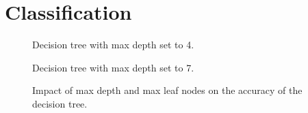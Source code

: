 \section{Classification} \label{sec:classfication}

\begin{figure}
    \centering
    \caption{Decision tree with max depth set to 4.}
    \label{fig:tree_4}
\end{figure}

\begin{figure}
    \centering
    \caption{Decision tree with max depth set to 7.}
    \label{fig:tree_7}
\end{figure}

\begin{figure}
    \centering
	\caption{Impact of max depth and max leaf nodes on the accuracy of the
    decision tree.}
\end{figure}


